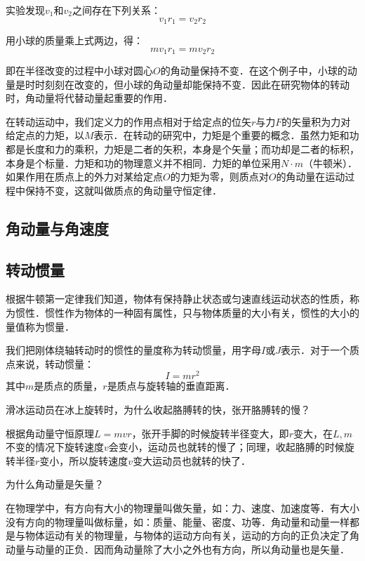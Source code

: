 实验发现$v_1$和$v_2$之间存在下列关系：
\begin{equation}
v_1r_1=v_2r_2
\end{equation}

用小球的质量乘上式两边，得：
\begin{equation}
mv_1r_1=mv_2r_2
\end{equation}

即在半径改变的过程中小球对圆心$O$的角动量保持不变．在这个例子中，小球的动量是时时刻刻在改变的，但小球的角动量却能保持不变．因此在研究物体的转动时，角动量将代替动量起重要的作用．

在转动运动中，我们定义力的作用点相对于给定点的位矢$r$与力$F$的矢量积为力对给定点的力矩，以$M$表示．在转动的研究中，力矩是个重要的概念．虽然力矩和功都是长度和力的乘积，力矩是二者的矢积，本身是个矢量；而功却是二者的标积，本身是个标量．力矩和功的物理意义并不相同．力矩的单位采用$N\cdot m$（牛顿米）．如果作用在质点上的外力对某给定点$O$的力矩为零，则质点对$O$的角动量在运动过程中保持不变，这就叫做质点的角动量守恒定律．
\subsection{角动量与角速度}

\subsection{转动惯量}
根据牛顿第一定律我们知道，物体有保持静止状态或匀速直线运动状态的性质，称为惯性．惯性作为物体的一种固有属性，只与物体质量的大小有关，惯性的大小的量值称为惯量．

我们把刚体绕轴转动时的惯性的量度称为转动惯量，用字母$I$或$J$表示．对于一个质点来说，转动惯量：
\begin{equation}
I=mr^{2}
\end{equation}
其中$m$是质点的质量，$r$是质点与旋转轴的垂直距离．


\begin{example}{}
滑冰运动员在冰上旋转时，为什么收起胳膊转的快，张开胳膊转的慢？

根据角动量守恒原理$L=mvr$，张开手脚的时候旋转半径变大，即$r$变大，在$L,m$不变的情况下旋转速度$v$会变小，运动员也就转的慢了；同理，收起胳膊的时候旋转半径$r$变小，所以旋转速度$v$变大运动员也就转的快了．
\end{example}
\begin{example}{}
为什么角动量是矢量？

在物理学中，有方向有大小的物理量叫做矢量，如：力、速度、加速度等．有大小没有方向的物理量叫做标量，如：质量、能量、密度、功等．角动量和动量一样都是与物体运动有关的物理量，与物体的运动方向有关，运动的方向的正负决定了角动量与动量的正负．因而角动量除了大小之外也有方向，所以角动量也是矢量．
\end{example}

